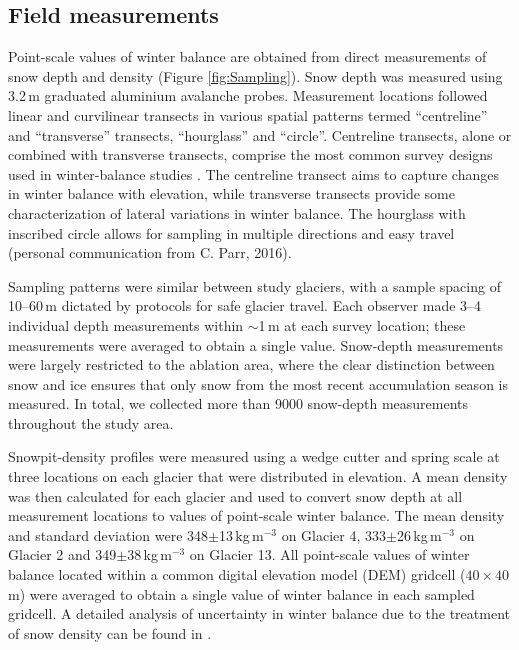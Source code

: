 \documentclass{article}
\begin{document}
\subsection{Field measurements}

Point-scale values of winter balance are obtained from direct measurements of snow depth and density (Figure \ref{fig:Sampling}). Snow depth was measured using  3.2\,m graduated aluminium avalanche probes. Measurement locations followed linear and curvilinear transects in various spatial patterns termed ``centreline'' and ``transverse'' transects, ``hourglass'' and ``circle''. 
Centreline transects, alone or combined with transverse transects, comprise the most common survey designs used in winter-balance studies \citep[e.g.][]{Kaser2002, Machguth2006}. The centreline transect aims to capture changes in winter balance with elevation, while transverse transects provide some characterization of lateral variations in winter balance. The hourglass with inscribed circle allows for sampling in multiple directions and easy travel (personal communication from C. Parr, 2016). 

Sampling patterns were similar between study glaciers, with a sample spacing of 10--60\,m dictated by protocols for safe glacier travel. Each observer made 3--4 individual depth measurements within $\sim$1\,m at each survey location; these measurements were averaged to obtain a single value. Snow-depth measurements were largely restricted to the ablation area, where the clear distinction between snow and ice ensures that only snow from the most recent accumulation season is measured. In total, we collected more than 9000 snow-depth measurements throughout the study area. 

Snowpit-density profiles were measured using a wedge cutter and spring scale at three locations on each glacier that were distributed in elevation. A mean density was then calculated for each glacier and used to convert snow depth at all measurement locations to values of point-scale winter balance. The mean density and standard deviation were 348$\pm$13\,kg\,m$^{-3}$ on Glacier 4, 333$\pm$26\,kg\,m$^{-3}$ on Glacier 2 and 349$\pm$38\,kg\,m$^{-3}$ on Glacier 13. All point-scale values of winter balance located within a common digital elevation model (DEM) gridcell ($40\times40$\,m) were averaged to obtain a single value of winter balance in each sampled gridcell. A detailed analysis of uncertainty in winter balance due to the treatment of snow density can be found in \cite{Pulwicki2017}.
\end{document}
